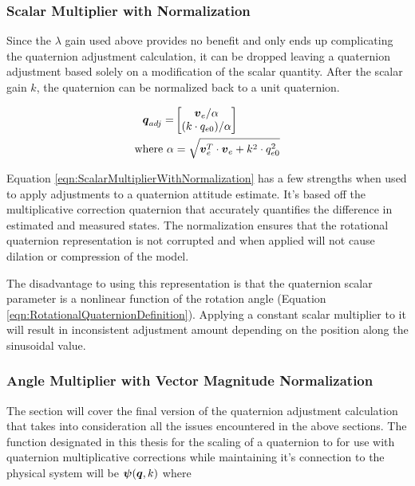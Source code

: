 \subsubsection{Scalar Multiplier with Normalization}
\label{subsubsec:ScalarMultiplierWithNormalization}

Since the $\lambda$ gain used above provides no benefit and only ends up complicating the quaternion adjustment calculation, it can be dropped leaving a quaternion adjustment based solely on a modification of the scalar quantity.  After the scalar gain $k$, the quaternion can be normalized back to a unit quaternion.

\begin{equation}
  \begin{aligned}
  \boldsymbol{q}_{adj} = & \begin{bmatrix} \boldsymbol{v}_e / \alpha \\ ( k \cdot q_{e0} )  / \alpha \end{bmatrix} \\
  \text{where } \alpha & = \sqrt{\boldsymbol{v}_e^T \cdot \boldsymbol{v}_e + k^2 \cdot q_{e0}^2}
  \end{aligned}
  \label{eqn:ScalarMultiplierWithNormalization}
\end{equation}

Equation \ref{eqn:ScalarMultiplierWithNormalization} has a few strengths when used to apply adjustments to a quaternion attitude estimate.  It's based off the multiplicative correction quaternion that accurately quantifies the difference in estimated and measured states.  The normalization ensures that the rotational quaternion representation is not corrupted and when applied will not cause dilation or compression of the model.

The disadvantage to using this representation is that the quaternion scalar parameter is a nonlinear function of the rotation angle (Equation \ref{eqn:RotationalQuaternionDefinition}).  Applying a constant scalar multiplier to it will result in inconsistent adjustment amount depending on the position along the sinusoidal value.

\subsubsection{Angle Multiplier with Vector Magnitude Normalization}
\label{subsubsec:AngleMultiplierWithVectorMagnitudeNormalization}

The section will cover the final version of the quaternion adjustment calculation that takes into consideration all the issues encountered in the above sections.  The function designated in this thesis for the scaling of a quaternion to for use with quaternion multiplicative corrections while maintaining it's connection to the physical system will be $\boldsymbol{\psi}(\boldsymbol{q}, k)$ where

